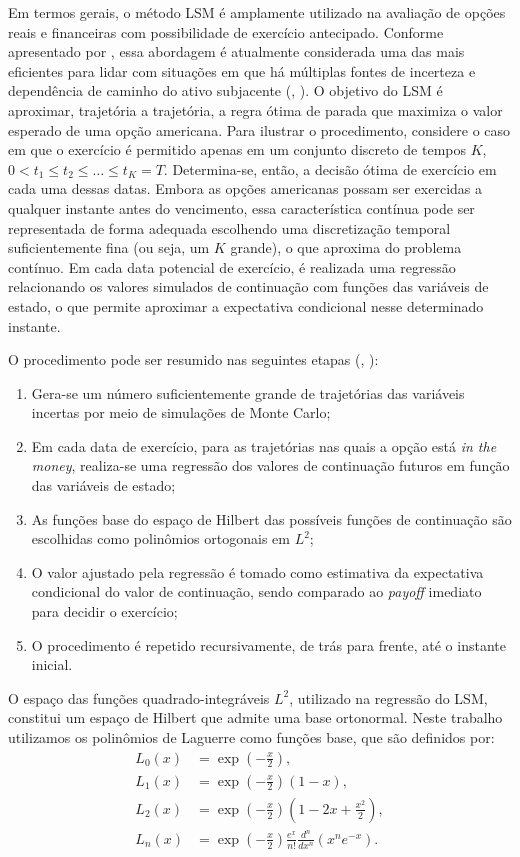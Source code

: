 Em termos gerais, o método LSM é amplamente utilizado na avaliação de opções reais e financeiras com possibilidade de exercício antecipado. Conforme apresentado por \cite{25}, essa abordagem é atualmente considerada uma das mais eficientes para lidar com situações em que há múltiplas fontes de incerteza e dependência de caminho do ativo subjacente (\cite{21}, \cite{26}). O objetivo do LSM é aproximar, trajetória a trajetória, a regra ótima de parada que maximiza o valor esperado de uma opção americana. Para ilustrar o procedimento, considere o caso em que o exercício é permitido apenas em um conjunto discreto de tempos $K$, $0 < t_1 \leq t_2 \leq \dots \leq t_K = T$. Determina-se, então, a decisão ótima de exercício em cada uma dessas datas. Embora as opções americanas possam ser exercidas a qualquer instante antes do vencimento, essa característica contínua pode ser representada de forma adequada escolhendo uma discretização temporal suficientemente fina (ou seja, um $K$ grande), o que aproxima do problema contínuo. Em cada data potencial de exercício, é realizada uma regressão relacionando os valores simulados de continuação com funções das variáveis de estado, o que permite aproximar a expectativa condicional nesse determinado instante.

O procedimento pode ser resumido nas seguintes etapas (\cite{25}, \cite{26}):
\begin{enumerate}[label=(\roman*)]
    \item Gera-se um número suficientemente grande de trajetórias das variáveis incertas por meio de simulações de Monte Carlo;
    \item Em cada data de exercício, para as trajetórias nas quais a opção está \textit{in the money}, realiza-se uma regressão dos valores de continuação futuros em função das variáveis de estado;
    \item As funções base do espaço de Hilbert das possíveis funções de continuação são escolhidas como polinômios ortogonais em $L^2$;
    \item O valor ajustado pela regressão é tomado como estimativa da expectativa condicional do valor de continuação, sendo comparado ao \textit{payoff} imediato para decidir o exercício;
    \item O procedimento é repetido recursivamente, de trás para frente, até o instante inicial.
\end{enumerate}

O espaço das funções quadrado-integráveis $L^2$, utilizado na regressão do LSM, constitui um espaço de Hilbert que admite uma base ortonormal. Neste trabalho utilizamos os polinômios de Laguerre como funções base, que são definidos por:
\begin{align}
L_0(x) &= \exp\left(-\frac{x}{2}\right), \\
L_1(x) &= \exp\left(-\frac{x}{2}\right)(1-x), \\
L_2(x) &= \exp\left(-\frac{x}{2}\right)\left(1 - 2x + \frac{x^2}{2}\right), \\
L_n(x) &= \exp\left(-\frac{x}{2}\right)\frac{e^x}{n!}\frac{d^n}{dx^n}\left(x^n e^{-x}\right).
\end{align}

